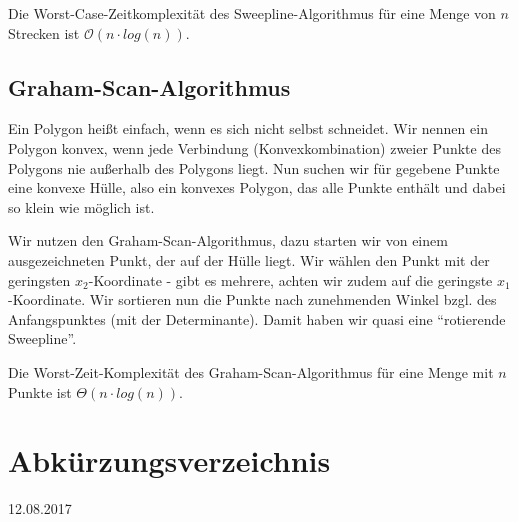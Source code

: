 \documentclass[12pt]{article}
\begin{document}
Die Worst-Case-Zeitkomplexität des Sweepline-Algorithmus für eine Menge von $n$ Strecken ist $\mathcal O(n \cdot log(n))$.

\subsection{Graham-Scan-Algorithmus}

Ein Polygon heißt einfach, wenn es sich nicht selbst schneidet. Wir nennen ein Polygon konvex, wenn jede Verbindung (Konvexkombination) zweier Punkte des Polygons nie außerhalb des Polygons liegt. Nun suchen wir für gegebene Punkte eine konvexe Hülle, also ein konvexes Polygon, das alle Punkte enthält und dabei so klein wie möglich ist.

Wir nutzen den Graham-Scan-Algorithmus, dazu starten wir von einem ausgezeichneten Punkt, der auf der Hülle liegt. Wir wählen den Punkt mit der geringsten $x_2$-Koordinate - gibt es mehrere, achten wir zudem auf die geringste $x_1$-Koordinate. Wir sortieren nun die Punkte nach zunehmenden Winkel bzgl. des Anfangspunktes (mit der Determinante). Damit haben wir quasi eine \enquote{rotierende Sweepline}.

Die Worst-Zeit-Komplexität des Graham-Scan-Algorithmus für eine Menge mit $n$ Punkte ist $\Theta(n \cdot log(n))$.

\section{Abkürzungsverzeichnis}

12.08.2017
\end{document}
